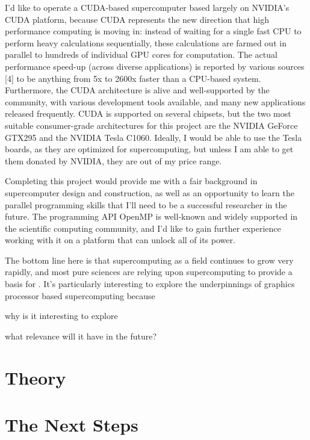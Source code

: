 \documentclass[10pt]{article}
\begin{document}
I'd like to operate a CUDA-based supercomputer based largely on NVIDIA's CUDA  platform, because CUDA represents the new direction that high performance computing is moving in: instead of waiting for a single fast CPU to perform heavy calculations sequentially, these calculations are farmed out in parallel to hundreds of individual GPU cores for computation. The actual performance speed-up (across diverse applications) is reported by various sources [4] to be anything from 5x to 2600x faster than a CPU-based system.  Furthermore, the CUDA architecture is alive and well-supported by the community, with various development tools available, and many new applications released frequently. CUDA is supported on several chipsets, but the two most suitable consumer-grade architectures for this project are the NVIDIA GeForce GTX295 and the NVIDIA Tesla C1060. Ideally, I would be able to use the Tesla boards, as they are optimized for supercomputing, but unless I am able to get them donated by NVIDIA, they are out of my price range.

Completing this project would provide me with a fair background in supercomputer design and construction, as well as an opportunity to learn the parallel programming skills that I'll need to be a successful researcher in the future. The programming API OpenMP is well-known and widely supported in the scientific computing community, and I'd like to gain further experience working with it on a platform that can unlock all of its power.

The bottom line here is that supercomputing as a field continues to grow very rapidly, and most pure sciences are relying upon supercomputing to provide a basis for . It's particularly interesting to explore the underpinnings of graphics processor based supercomputing because 

why is it interesting to explore

what relevance will it have in the future?


\section{Theory}

\section{The Next Steps}
\end{document}
